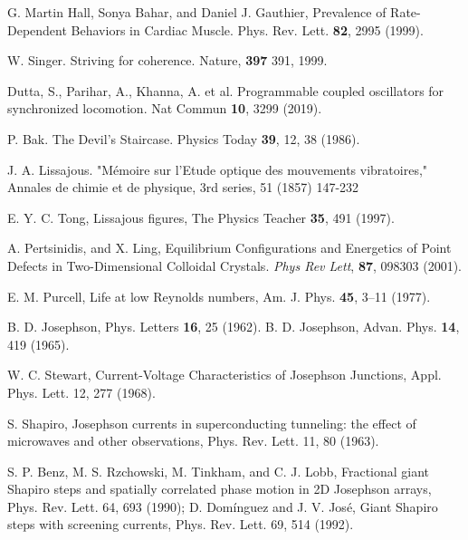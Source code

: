 \documentclass[twocolumn,preprintnumbers,amsmath,amssymb,aps,prx]{revtex4}
\begin{document}
\begin{thebibliography}{99}
   G. Martin Hall, Sonya Bahar, and Daniel J. Gauthier, Prevalence of Rate-Dependent Behaviors in Cardiac Muscle. Phys. Rev. Lett. {\bf 82}, 2995 (1999).

   W. Singer. Striving for coherence. Nature, {\bf 397} 391, 1999.

     Dutta, S., Parihar, A., Khanna, A. et al. Programmable coupled oscillators for synchronized locomotion. Nat Commun {\bf 10}, 3299 (2019).
    
     P. Bak. The Devil's Staircase. Physics Today {\bf 39}, 12, 38 (1986).

     J. A. Lissajous.  "Mémoire sur l'Etude optique des mouvements vibratoires,"  Annales de chimie et de physique, 3rd series, 51 (1857) 147-232

     E. Y. C. Tong, Lissajous figures, The Physics Teacher {\bf 35}, 491 (1997).

       A. Pertsinidis, and X. Ling,  Equilibrium Configurations and Energetics of Point Defects in Two-Dimensional Colloidal Crystals. {\it Phys Rev Lett}, {\bf 87}, 098303 (2001). %
      
     E. M. Purcell, Life at low Reynolds numbers, Am. J. Phys. {\bf 45}, 3–11 (1977).


     B. D. Josephson, Phys. Letters {\bf 16}, 25 (1962). 
     B. D. Josephson, Advan. Phys. {\bf 14}, 419 (1965).

      W. C. Stewart, Current-Voltage Characteristics of Josephson Junctions, Appl. Phys. Lett. 12, 277 (1968).
      
     S. Shapiro, Josephson currents in superconducting tunneling: the effect of microwaves and other observations, Phys. Rev. Lett. 11, 80 (1963).

      S. P. Benz, M. S. Rzchowski, M. Tinkham, and C. J. Lobb, Fractional giant Shapiro steps and spatially correlated phase motion in 2D Josephson arrays, Phys. Rev. Lett. 64, 693 (1990); D. Dom{\'i}nguez and J. V. Jos{\'e}, Giant Shapiro steps with screening currents, Phys. Rev. Lett. 69,
514 (1992).


\end{thebibliography}
\end{document}
